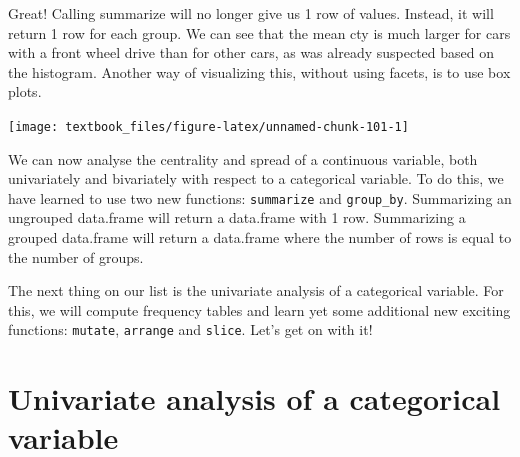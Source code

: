 \documentclass[]{tufte-book}
\newenvironment{Shaded}{}{}
\newcommand{\DataTypeTok}[1]{\textcolor[rgb]{0.56,0.13,0.00}{#1}}
\newcommand{\DecValTok}[1]{\textcolor[rgb]{0.25,0.63,0.44}{#1}}
\newcommand{\FloatTok}[1]{\textcolor[rgb]{0.25,0.63,0.44}{#1}}
\newcommand{\KeywordTok}[1]{\textcolor[rgb]{0.00,0.44,0.13}{\textbf{#1}}}
\newcommand{\NormalTok}[1]{#1}
\newcommand{\OperatorTok}[1]{\textcolor[rgb]{0.40,0.40,0.40}{#1}}
\newcommand{\StringTok}[1]{\textcolor[rgb]{0.25,0.44,0.63}{#1}}
\begin{document}
Great! Calling summarize will no longer give us 1 row of values. Instead, it will return 1 row for each group. We can see that the mean cty is much larger for cars with a front wheel drive than for other cars, as was already suspected based on the histogram. Another way of visualizing this, without using facets, is to use box plots.

\begin{Shaded}
\end{Shaded}

\texttt{[image: textbook\_files/figure-latex/unnamed-chunk-101-1]}

We can now analyse the centrality and spread of a continuous variable, both univariately and bivariately with respect to a categorical variable. To do this, we have learned to use two new functions: \texttt{summarize} and \texttt{group\_by}. Summarizing an ungrouped data.frame will return a data.frame with 1 row. Summarizing a grouped data.frame will return a data.frame where the number of rows is equal to the number of groups.

The next thing on our list is the univariate analysis of a categorical variable. For this, we will compute frequency tables and learn yet some additional new exciting functions: \texttt{mutate}, \texttt{arrange} and \texttt{slice}. Let's get on with it!

\hypertarget{univariate-analysis-of-a-categorical-variable}{%
\section{Univariate analysis of a categorical variable}\label{univariate-analysis-of-a-categorical-variable}}
\end{document}
